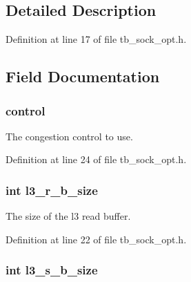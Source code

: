 \subsection{Detailed Description}


Definition at line 17 of file tb\-\_\-sock\-\_\-opt.\-h.



\subsection{Field Documentation}
\hypertarget{structtb__options__t_a50b4d1da7c10bfd1e9365a1c37d09442}{
\subsubsection[{control}]{ control}}\label{structtb__options__t_a50b4d1da7c10bfd1e9365a1c37d09442}


The congestion control to use. 



Definition at line 24 of file tb\-\_\-sock\-\_\-opt.\-h.

\hypertarget{structtb__options__t_aa9d1ab0c9c6ef33a4b6bd60172dd0ec5}{
\subsubsection[{l3\-\_\-r\-\_\-b\-\_\-size}]{\setlength{\rightskip}{0pt plus 5cm}int l3\-\_\-r\-\_\-b\-\_\-size}}\label{structtb__options__t_aa9d1ab0c9c6ef33a4b6bd60172dd0ec5}


The size of the l3 read buffer. 



Definition at line 22 of file tb\-\_\-sock\-\_\-opt.\-h.

\hypertarget{structtb__options__t_a5e71f50be7927448ed7d21d809361fec}{
\subsubsection[{l3\-\_\-s\-\_\-b\-\_\-size}]{\setlength{\rightskip}{0pt plus 5cm}int l3\-\_\-s\-\_\-b\-\_\-size}}\label{structtb__options__t_a5e71f50be7927448ed7d21d809361fec}


